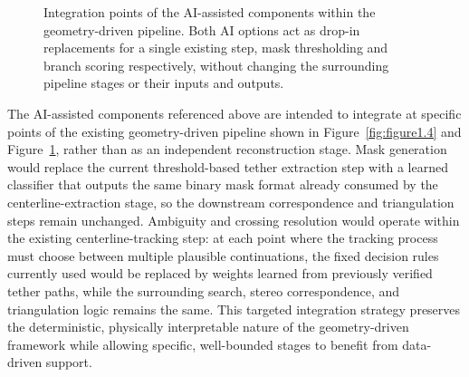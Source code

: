 \begin{figure}[htbp]
    \centering
    \caption[Integration points of the AI-assisted components within the geometry-driven pipeline]{Integration points of the AI-assisted components within the geometry-driven pipeline. Both AI options act as drop-in replacements for a single existing step, mask thresholding and branch scoring respectively, without changing the surrounding pipeline stages or their inputs and outputs.}
    \label{fig:ai-integration-points}
\end{figure}

The AI-assisted components referenced above are intended to integrate at specific points of the existing geometry-driven pipeline shown in Figure~\ref{fig:figure1.4} and Figure~\ref{fig:ai-integration-points}, rather than as an independent reconstruction stage. Mask generation would replace the current threshold-based tether extraction step with a learned classifier that outputs the same binary mask format already consumed by the centerline-extraction stage, so the downstream correspondence and triangulation steps remain unchanged. Ambiguity and crossing resolution would operate within the existing centerline-tracking step: at each point where the tracking process must choose between multiple plausible continuations, the fixed decision rules currently used would be replaced by weights learned from previously verified tether paths, while the surrounding search, stereo correspondence, and triangulation logic remains the same. This targeted integration strategy preserves the deterministic, physically interpretable nature of the geometry-driven framework while allowing specific, well-bounded stages to benefit from data-driven support.

